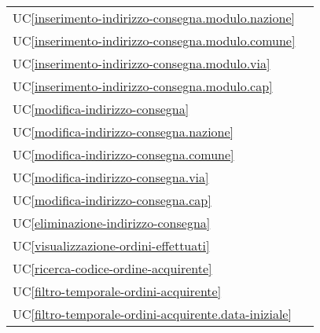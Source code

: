 \begin{longtable}{C{6cm} C{6cm}}
	UC\ref{inserimento-indirizzo-consegna.modulo.nazione} &  \\

    UC\ref{inserimento-indirizzo-consegna.modulo.comune} &  \\

	UC\ref{inserimento-indirizzo-consegna.modulo.via} &  \\

    UC\ref{inserimento-indirizzo-consegna.modulo.cap} &  \\

	UC\ref{modifica-indirizzo-consegna} &  \\

    UC\ref{modifica-indirizzo-consegna.nazione} &  \\

	UC\ref{modifica-indirizzo-consegna.comune} &  \\

    UC\ref{modifica-indirizzo-consegna.via} &  \\

	UC\ref{modifica-indirizzo-consegna.cap} &  \\

    UC\ref{eliminazione-indirizzo-consegna} &  \\

	UC\ref{visualizzazione-ordini-effettuati} &   \\

	UC\ref{ricerca-codice-ordine-acquirente} &  \\

    UC\ref{filtro-temporale-ordini-acquirente} &  \\

	UC\ref{filtro-temporale-ordini-acquirente.data-iniziale} &  \\


\end{longtable}
